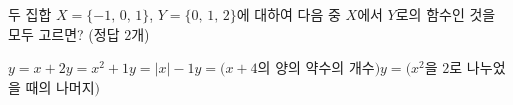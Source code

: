 두 집합 $X=\{-1,\,0,\,1\}$, $Y=\{0,\,1,\,2\}$에 대하여 다음 중 $X$에서 $Y$로의 함수인 것을 모두 고르면? (정답 $2$개)
\begin{choicesv}{$y=x+2$}{$y=x^2+1$}{$y=|x|-1$}{$y=(x+4$의 양의 약수의 개수$)$}{$y=(x^2$을 $2$로 나누었을 때의 나머지$)$}\end{choicesv}
